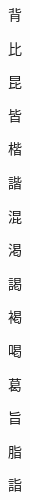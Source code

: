 \begin{spacing}{2.5}
{\Huge \begin{CJK}{UTF8}{min} 背\end{CJK}}\hspace{0.1cm}
{\Huge \begin{CJK}{UTF8}{min} 比\end{CJK}}\hspace{0.1cm}
{\Huge \begin{CJK}{UTF8}{min} 昆\end{CJK}}\hspace{0.1cm}
{\Huge \begin{CJK}{UTF8}{min} 皆\end{CJK}}\hspace{0.1cm}
{\Huge \begin{CJK}{UTF8}{min} 楷\end{CJK}}\hspace{0.1cm}
{\Huge \begin{CJK}{UTF8}{min} 諧\end{CJK}}\hspace{0.1cm}
{\Huge \begin{CJK}{UTF8}{min} 混\end{CJK}}\hspace{0.1cm}
{\Huge \begin{CJK}{UTF8}{min} 渇\end{CJK}}\hspace{0.1cm}
{\Huge \begin{CJK}{UTF8}{min} 謁\end{CJK}}\hspace{0.1cm}
{\Huge \begin{CJK}{UTF8}{min} 褐\end{CJK}}\hspace{0.1cm}
{\Huge \begin{CJK}{UTF8}{min} 喝\end{CJK}}\hspace{0.1cm}
{\Huge \begin{CJK}{UTF8}{min} 葛\end{CJK}}\hspace{0.1cm}
{\Huge \begin{CJK}{UTF8}{min} 旨\end{CJK}}\hspace{0.1cm}
{\Huge \begin{CJK}{UTF8}{min} 脂\end{CJK}}\hspace{0.1cm}
{\Huge \begin{CJK}{UTF8}{min} 詣\end{CJK}}\hspace{0.1cm}

\end{spacing}
